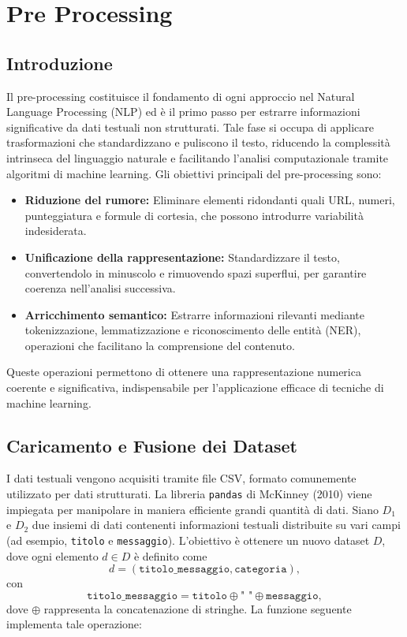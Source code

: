 
\chapter{Pre Processing}

\section{Introduzione}
Il pre-processing costituisce il fondamento di ogni approccio nel Natural Language Processing (NLP) ed è il primo passo per estrarre informazioni significative da dati testuali non strutturati. Tale fase si occupa di applicare trasformazioni che standardizzano e puliscono il testo, riducendo la complessità intrinseca del linguaggio naturale e facilitando l'analisi computazionale tramite algoritmi di machine learning.
Gli obiettivi principali del pre-processing sono:
\begin{itemize}
    \item \textbf{Riduzione del rumore:} Eliminare elementi ridondanti quali URL, numeri, punteggiatura e formule di cortesia, che possono introdurre variabilità indesiderata.
    \item \textbf{Unificazione della rappresentazione:} Standardizzare il testo, convertendolo in minuscolo e rimuovendo spazi superflui, per garantire coerenza nell'analisi successiva.
    \item \textbf{Arricchimento semantico:} Estrarre informazioni rilevanti mediante tokenizzazione, lemmatizzazione e riconoscimento delle entità (NER), operazioni che facilitano la comprensione del contenuto.
\end{itemize}

Queste operazioni permettono di ottenere una rappresentazione numerica coerente e significativa, indispensabile per l'applicazione efficace di tecniche di machine learning.

\section{Caricamento e Fusione dei Dataset}
I dati testuali vengono acquisiti tramite file CSV, formato comunemente utilizzato per dati strutturati. La libreria \texttt{pandas} di McKinney (2010) viene impiegata per manipolare in maniera efficiente grandi quantità di dati. Siano $D_1$ e $D_2$ due insiemi di dati contenenti informazioni testuali distribuite su vari campi (ad esempio, \texttt{titolo} e \texttt{messaggio}). L'obiettivo è ottenere un nuovo dataset $D$, dove ogni elemento $d \in D$ è definito come
\[
d = (\texttt{titolo\_messaggio}, \texttt{categoria}),
\]
con
\[
\texttt{titolo\_messaggio} = \texttt{titolo} \oplus \texttt{" "} \oplus \texttt{messaggio},
\]
dove $\oplus$ rappresenta la concatenazione di stringhe. La funzione seguente implementa tale operazione:

